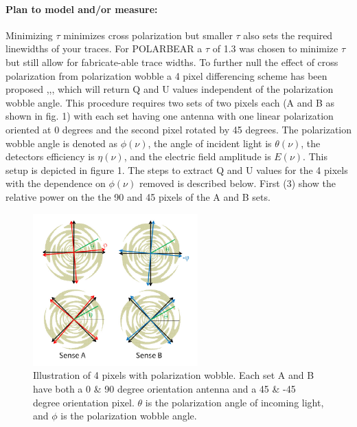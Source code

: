 \paragraph{Plan to model and/or measure:}
Minimizing $\tau$ minimizes cross polarization but smaller $\tau$ also sets the required linewidths of your traces. For POLARBEAR a $\tau$ of 1.3 was chosen to minimize $\tau$ but still allow for fabricate-able trace widths. To further null the effect of cross polarization from polarization wobble a 4 pixel differencing scheme has been proposed \cite{TokiThesis},\cite{TokiMemo1},\cite{TokiMemo2}, which will return Q and U values independent of the polarization wobble angle. This procedure requires two sets of two pixels each (A and B as shown in fig. 1) with each set having one antenna with one linear polarization oriented at 0 degrees and the second pixel rotated by 45 degrees. The polarization wobble angle is denoted as $\phi(\nu)$, the angle of incident light is $\theta(\nu)$, the detectors efficiency is $\eta(\nu)$, and the electric field amplitude is $E(\nu)$. This setup is depicted in figure 1. The steps to extract Q and U values for the 4 pixels with the dependence on $\phi(\nu)$ removed is described below. First (3) show the relative power on the the 90 and 45 pixels of the A and B sets.
\begin{figure}
\centering
\includegraphics[width=2.5in]{figures/4pixelremovewobble.png}
\caption{Illustration of 4 pixels with polarization wobble. Each set A and B have both a 0 \& 90 degree orientation antenna and a 45 \& -45 degree orientation pixel. $\theta$ is the polarization angle of incoming light, and $\phi$ is the polarization wobble angle.}
\label{4pixelwobbleremoval}
\end{figure}
